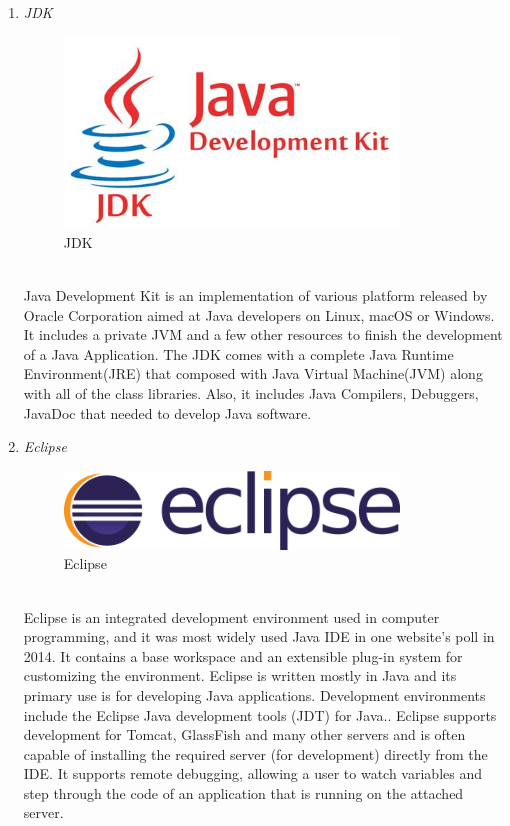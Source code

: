 \documentclass[conference]{IEEEtran}
\begin{document}
\begin{enumerate}
   \item \textit{JDK }
                   \begin{figure}[htbp]
    \centerline{\includegraphics[width=89mm, scale=0.5]{fig/jdk.png}}
    \caption{JDK}
    \label{fig}
    \end{figure}
   \\Java Development Kit is an implementation of various platform released by Oracle Corporation aimed at Java developers on Linux, macOS or Windows. It includes a private JVM and a few other resources to finish the development of a Java Application.  The JDK comes with a complete Java Runtime Environment(JRE) that composed with  Java Virtual Machine(JVM) along with all of the class libraries. Also, it includes Java Compilers, Debuggers, JavaDoc that needed to develop Java software.\\
      \item \textit{Eclipse}
                      \begin{figure}[htbp]
    \centerline{\includegraphics[width=89mm, scale=0.5]{fig/eclipse.png}}
    \caption{Eclipse}
    \label{fig}
    \end{figure}
   \\Eclipse is an integrated development environment used in computer programming, and it was most widely used Java IDE in one website’s poll in 2014.  It contains a base workspace and an extensible plug-in system for customizing the environment. Eclipse is written mostly in Java and its primary use is for developing Java applications. Development environments include the Eclipse Java development tools (JDT) for Java.. Eclipse supports development for Tomcat, GlassFish and many other servers and is often capable of installing the required server (for development) directly from the IDE. It supports remote debugging, allowing a user to watch variables and step through the code of an application that is running on the attached server.\\
   

\end{enumerate}
\end{document}
